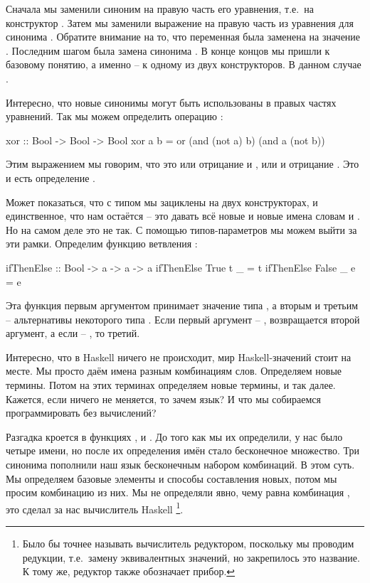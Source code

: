 Сначала мы заменили синоним  на правую часть
его уравнения, т.е.~на конструктор . Затем мы заменили
выражение  на правую часть из уравнения
для синонима . Обратите внимание на то, что переменная
 была заменена на значение .
Последним шагом была замена синонима
. В конце концов мы пришли к базовому понятию, а именно -- к 
одному из двух конструкторов. В данном случае .

Интересно, что новые синонимы могут быть использованы 
в правых частях уравнений. Так мы можем определить операцию
:

\begin{code}
xor :: Bool -> Bool -> Bool
xor a b = or (and (not a) b) (and a (not b))
\end{code}

Этим выражением мы говорим, что  это
или отрицание  и , или  и отрицание .
Это и есть определение .

Может показаться, что с типом  мы зациклены
на двух конструкторах, и единственное, что нам остаётся -- 
это давать всё новые и новые имена словам 
и . Но на самом деле это не так. 
С помощью типов-параметров мы можем выйти за эти рамки.
Определим функцию ветвления :

\begin{code}
ifThenElse :: Bool -> a -> a -> a
ifThenElse True   t  _ = t
ifThenElse False  _  e = e
\end{code}

Эта функция первым аргументом принимает значение
типа , а вторым и третьим -- альтернативы 
некоторого типа . Если первый аргумент --
, возвращается второй аргумент, а если -- ,
то третий. 

Интересно, что в Haskell ничего не происходит,
мир Haskell-значений стоит на месте. Мы просто даём 
имена разным комбинациям слов. Определяем новые термины.
Потом на этих терминах определяем  новые термины,
и так далее. Кажется, если ничего не меняется, то зачем 
язык? И что мы собираемся программировать без вычислений? 

Разгадка кроется в функциях ,  и .
До того как мы их определили, у нас было четыре имени, но
после их определения имён стало бесконечное множество.
Три синонима пополнили наш язык бесконечным набором
комбинаций. В этом суть. Мы определяем базовые элементы
и способы составления новых, потом мы просим 
 комбинацию из них. Мы не определяли
явно, 
чему равна комбинация , это сделал за 
нас вычислитель Haskell
\footnote{Было бы точнее называть вычислитель редуктором,
поскольку мы проводим редукции, т.е.~замену эквивалентных
значений, но закрепилось это название. К тому же, редуктор также обозначает прибор.}.

